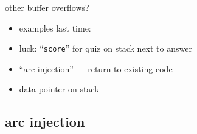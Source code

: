 \begin{frame}{other buffer overflows?}
    \begin{itemize}
        \item examples last time:
        \vspace{.5cm}
        \item luck: ``\texttt{score}'' for quiz on stack next to answer
        \item ``arc injection'' --- return to existing code
        \item data pointer on stack
    \end{itemize}
\end{frame}


\subsection{arc injection}

